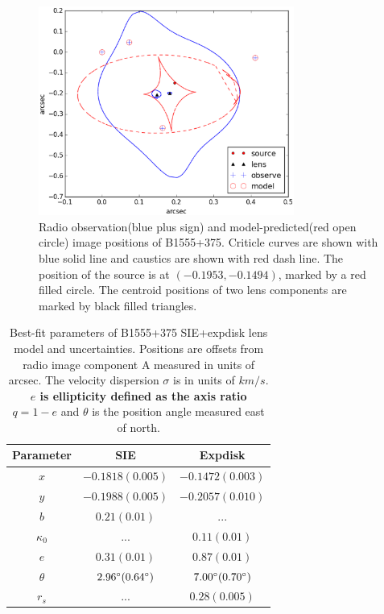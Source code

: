 \documentclass[useAMS,usenatbib]{mn2e}
\begin{document}
\begin{figure}
\includegraphics[width=84mm]{gravlens_exp_try5_plot.eps}
\caption{Radio observation(blue plus sign) and model-predicted(red open circle) image positions of B1555+375. Criticle curves are shown with blue solid line and caustics are shown with red dash line. The position of the source is at $(-0.1953,-0.1494)$, marked by a red filled circle. The centroid positions of two lens components are marked by black filled triangles.  \label{fig2}}
\end{figure}


\begin{table}
 \centering
  \caption{Best-fit parameters of B1555+375 SIE+expdisk lens model and uncertainties. Positions are offsets from radio image component A measured in units of arcsec. The velocity dispersion $\sigma$ is in units of $km/s$. \textbf{$e$ is ellipticity defined as the axis ratio $q=1-e$ }and $\theta$ is the position angle measured east of north.}
  \begin{tabular}{@{}ccc}
\hline 
 Parameter  & SIE & Expdisk 		   
\\
\hline
$x$  	  & $-0.1818 (0.005)$	&$-0.1472 (0.003)$ 	  \\
$y$	  &$-0.1988 (0.005)$	&$-0.2057 (0.010)$	 \\

$b$ &$0.21 (0.01)$  & ...   \\
$\kappa_0$ & ... & $0.11 (0.01)$        \\  
$e$	  & $0.31(0.01)$	&$0.87 (0.01)$ \\
$\theta$ &$2.96 \hbox{$^\circ$} (0.64 \hbox{$^\circ$})$ &$7.00\hbox{$^\circ$} (0.70 \hbox{$^\circ$})$ \\
$r_s$	& ...  & $0.28 (0.005)$\\
\hline
\end{tabular}

\end{table}
\end{document}
